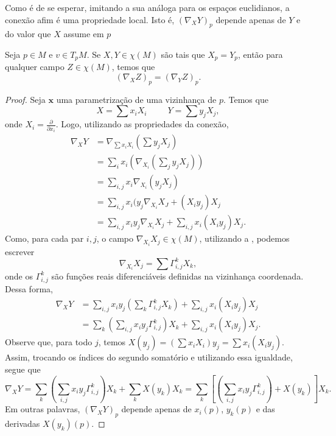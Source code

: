 Como é de se esperar, imitando a sua análoga para os espaços euclidianos, a conexão afim é uma propriedade local. Isto é, $(\nabla_{X}Y)_{p}$ depende apenas de $Y$ e do valor que $X$ assume em $p$
\begin{lemma}
	\label{lem:conexao-afim-local}
	Seja $p \in M$ e $v \in T_{p}M$. Se $X, Y \in \chi(M)$ são tais que $X_{p}=Y_{p}$, então para qualquer campo $Z \in \chi(M)$, temos que
	\begin{equation*}
		(\nabla_{X}Z)_{p}=(\nabla _{Y}Z)_{p}.
	\end{equation*}
	\begin{proof}

		Seja $\mathbf{x}$ uma parametrização de uma vizinhança de $p$. Temos que
		\begin{equation*}
			X=\sum x_i X_{i} \ \ \ \ \ \ \ \ \ \ \ Y=\sum y_{j}X_{j},
		\end{equation*}
		onde $X_{i}=\frac{\partial}{\partial x_{i}}$.
		Logo, utilizando as propriedades da conexão,
		\begin{align*}
			\nabla_{X}Y & = \nabla_{\sum x_{i}X_{i}}\left( \sum y_{j}X_{j} \right)                       \\
			            & =\sum_{i} x_{i}\left( \nabla_{X_{i}}\left( \sum_{j} y_{j}X_{j} \right) \right) \\
			            & =\sum_{i,j}x_{i}\nabla_{X_{i}}(y_{j}X_{j})                                     \\
			            & =\sum_{i,j}x_{i}(y_{j}\nabla_{X_{i}}X_{J}+(X_{i}y_{j})X_{j}                    \\
			            & = \sum_{i,j}x_{i}y_{j}\nabla_{X_{i}}X_{j}+\sum_{i,j}x_{i}(X_{i}y_{j})X_{j}.
		\end{align*}
		Como, para cada par $i, j$, o campo $\nabla_{X_{i}}X_{j}\in \chi(M)$, utilizando a , podemos escrever
		\begin{equation*}
			\nabla_{X_{i}}X_{j}=\sum \Gamma_{i,j}^{k}X_{k},
		\end{equation*}
		onde os $\Gamma_{i,j}^{k}$ são funções reais diferenciáveis definidas na vizinhança coordenada.
		Dessa forma,
		\begin{align*}
			\nabla_{X}Y & = \sum_{i,j} x_{i}y_{j}\left( \sum_{k}\Gamma_{i,j}^{k}X_{k}\right)+\sum_{i,j}x_{i}(X_{i}y_{j})X_{j}   \\
			            & =\sum_{k}\left( \sum_{i,j}x_{i}y_{j}\Gamma_{i,j}^{k} \right)X_{k} + \sum_{i,j}x_{i}(X_{i}y_{j})X_{j}.
		\end{align*}
		Observe que, para todo $j$, temos $X(y_{j})=\left( \sum x_{i}X_{i} \right)y_{j}=\sum x_{i}(X_{i}y_{j})$. Assim, trocando os índices do segundo somatório e utilizando essa igualdade, segue que
		\begin{equation*}
			\nabla_{X}Y=\sum_{k}\left( \sum_{i,j}x_{i}y_{j}\Gamma_{i,j}^{k} \right)X_{k} + \sum_{k}X(y_{k})X_{k}= \sum_{k}\left[\left( \sum_{i,j}x_{i}y_{j}\Gamma_{i,j}^{k} \right)+X(y_{k})\right]X_{k}.
		\end{equation*}
		Em outras palavras, $(\nabla_{X}Y)_{p}$ depende apenas de $x_{i}(p)$, $y_{k}(p)$ e das derivadas $X(y_{k})(p)$.


\end{proof}
\end{lemma}
